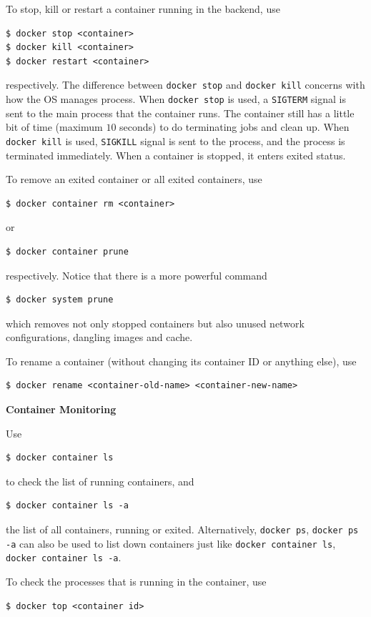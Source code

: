 To stop, kill or restart a container running in the backend, use
\begin{lstlisting}
$ docker stop <container>
$ docker kill <container>
$ docker restart <container>
\end{lstlisting}
respectively. The difference between \verb|docker stop| and \verb|docker kill| concerns with how the OS manages process. When \verb|docker stop| is used, a  \verb|SIGTERM| signal is sent to the main process that the container runs. The container still has a little bit of time (maximum $10$ seconds) to do terminating jobs and clean up. When \verb|docker kill| is used, \verb|SIGKILL| signal is sent to the process, and the process is terminated immediately. When a container is stopped, it enters exited status. 

To remove an exited container or all exited containers, use
\begin{lstlisting}
$ docker container rm <container>
\end{lstlisting}
or
\begin{lstlisting}
$ docker container prune
\end{lstlisting}
respectively. Notice that there is a more powerful command
\begin{lstlisting}
$ docker system prune
\end{lstlisting}
which removes not only stopped containers but also unused network configurations, dangling images and cache.

To rename a container (without changing its container ID or anything else), use
\begin{lstlisting}
$ docker rename <container-old-name> <container-new-name>
\end{lstlisting}

\vspace{0.1in}
\noindent \textbf{Container Monitoring}
\vspace{0.1in}

Use
\begin{lstlisting}
$ docker container ls
\end{lstlisting}
to check the list of running containers, and
\begin{lstlisting}
$ docker container ls -a
\end{lstlisting}
the list of all containers, running or exited. Alternatively, \verb|docker ps|, \verb|docker ps -a| can also be used to list down containers just like \verb|docker container ls|, \verb|docker container ls -a|.

To check the processes that is running in the container, use
\begin{lstlisting}
$ docker top <container id>
\end{lstlisting}


